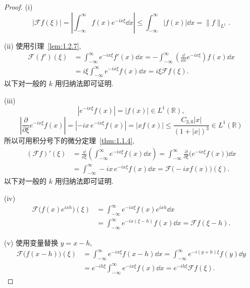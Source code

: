 \begin{proof}
(i)
\begin{equation*}
|\mathcal{F}f(\xi)| = \left|\int_{-\infty}^{\infty} f(x)e^{-ix\xi}\dd x\right| \leq \int_{-\infty}^{\infty}|f(x)|\dd x = \| f \|_{L^{1}}.
\end{equation*}

(ii) 使用引理~\ref{lem:1.2.7},
\begin{align*}
\mathcal{F}(f')(\xi) & = \int_{-\infty}^{\infty} e^{-ix\xi}f'(x)\dd x = -\int_{-\infty}^{\infty}\left(\frac{\dd}{\dd x}e^{-ix\xi}\right)f(x)\dd x \\
& = i\xi\int_{-\infty}^{\infty} e^{-ix\xi}f(x)\dd x = i\xi\mathcal{F}f(\xi).
\end{align*}
以下对一般的 $k$ 用归纳法即可证明.

(iii)
\begin{equation*}
\left|e^{-ix\xi}f(x)\right| = |f(x)| \in L^{1}(\mathbb{R}),
\end{equation*}
\begin{equation*}
\left|\frac{\partial}{\partial \xi}e^{-ix\xi}f(x)\right| = |-ix\,e^{-ix\xi}f(x)| = |xf(x)| \leq \frac{C_{3,0}|x|}{(1 + |x|)^{3}} \in L^{1}(\mathbb{R})
\end{equation*}
所以可用积分号下的微分定理~\ref{thm:1.1.4},
\begin{align*}
(\mathcal{F}f)'(\xi) & = \frac{\dd}{\dd \xi}\left(\int_{-\infty}^{\infty} e^{-ix\xi}f(x)\dd x\right) = \int_{-\infty}^{\infty}\frac{\partial}{\partial \xi}\bigl(e^{-ix\xi}f(x)\bigr)\dd x \\
& = \int_{-\infty}^{\infty} -ix\,e^{-ix\xi}f(x)\dd x = \mathcal{F}\bigl(-ixf(x)\bigr)(\xi).
\end{align*}
以下对一般的 $k$ 用归纳法即可证明.

(iv)
\begin{align*}
\mathcal{F}\bigl(f(x)e^{ixh}\bigr)(\xi) & = \int_{-\infty}^{\infty} e^{-ix\xi}f(x)e^{ixh}\dd x \\
& = \int_{-\infty}^{\infty} e^{-ix(\xi - h)}f(x)\dd x = \mathcal{F}f(\xi - h).
\end{align*}

(v) 使用变量替换 $y = x - h$,
\begin{align*}
\mathcal{F}\bigl(f(x - h)\bigr)(\xi) & = \int_{-\infty}^{\infty} e^{-ix\xi}f(x - h)\dd x = \int_{-\infty}^{\infty} e^{-i(y+h)\xi}f(y)\dd y \\
& = e^{-ih\xi}\int_{-\infty}^{\infty} e^{-ix\xi}f(x)\dd x = e^{-ih\xi}\mathcal{F}f(\xi).
\end{align*}


\end{proof}
